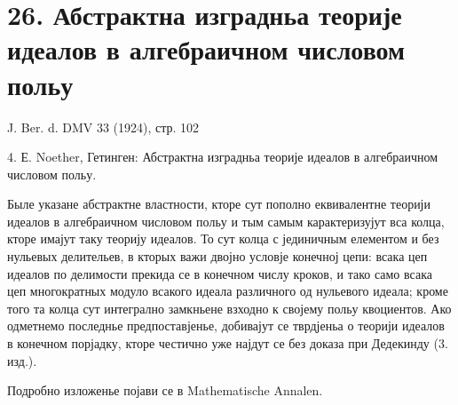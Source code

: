 ﻿\documentclass[11pt]{article}
\begin{document}
\section*{26. Абстрактна изградньа теорије идеалов в алгебраичном числовом польу}

\begin{center}
J. Ber. d. DMV 33 (1924), стр. 102
\end{center}

4. Е. Noether, Гетинген: Абстрактна изградньа теорије идеалов в алгебраичном числовом польу.

Быле указане абстрактне властности, кторе сут пополно еквивалентне теорији идеалов в алгебраичном числовом польу и тым самым карактеризујут вса колца, кторе имајут таку теорију идеалов. То сут колца с јединичным елементом и без нульевых делительев, в кторых важи двојно условје конечној цепи: всака цеп идеалов по делимости прекида се в конечном числу кроков, и тако само всака цеп многократных модуло всакого идеала различного од нульевого идеала; кроме того та колца сут интегрално замкньене взходно к својему польу квоциентов. Ако одметнемо последнье предпоставјенье, добивајут се тврдјеньа о теорији идеалов в конечном порјадку, кторе честично уже најдут се без доказа при Дедекинду (3. изд.).

Подробно изложенье појави се в Mathematische Annalen.
\end{document}
